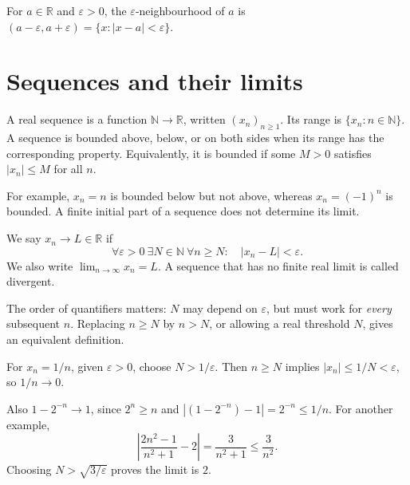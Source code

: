 \begin{definition}[Neighbourhood]
For $a\in\mathbb R$ and $\varepsilon>0$, the $\varepsilon$-neighbourhood
of $a$ is $(a-\varepsilon,a+\varepsilon)=\{x:|x-a|<\varepsilon\}$.
\end{definition}
\begin{center}
\end{center}

\section{Sequences and their limits}
\begin{definition}
A real sequence is a function $\mathbb N\to\mathbb R$, written $(x_n)_{n\geq1}$.
Its range is $\{x_n:n\in\mathbb N\}$. A sequence is bounded above, below,
or on both sides when its range has the corresponding property.
Equivalently, it is bounded if some $M>0$ satisfies $|x_n|\leq M$ for all $n$.
\end{definition}
For example, $x_n=n$ is bounded below but not above, whereas $x_n=(-1)^n$
is bounded. A finite initial part of a sequence does not determine its limit.

\begin{definition}[Convergence]\label{def:analysis-sequence-limit}
We say $x_n\to L\in\mathbb R$ if
\[
\forall\varepsilon>0\ \exists N\in\mathbb N\ \forall n\geq N:
\quad |x_n-L|<\varepsilon.
\]
We also write $\lim_{n\to\infty}x_n=L$. A sequence that has no finite real
limit is called divergent.
\end{definition}
The order of quantifiers matters: $N$ may depend on $\varepsilon$, but must
work for \emph{every} subsequent $n$. Replacing $n\geq N$ by $n>N$, or
allowing a real threshold $N$, gives an equivalent definition.

\begin{example}
For $x_n=1/n$, given $\varepsilon>0$, choose $N>1/\varepsilon$. Then
$n\geq N$ implies $|x_n|\leq1/N<\varepsilon$, so $1/n\to0$.

Also $1-2^{-n}\to1$, since $2^n\geq n$ and
$|(1-2^{-n})-1|=2^{-n}\leq1/n$.
For another example,
\[
\left|\frac{2n^2-1}{n^2+1}-2\right|=\frac3{n^2+1}\leq\frac3{n^2}.
\]
Choosing $N>\sqrt{3/\varepsilon}$ proves the limit is $2$.
\end{example}

